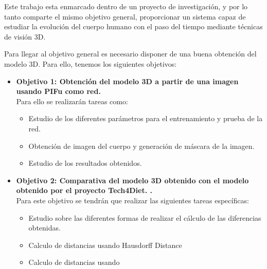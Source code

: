 
Este trabajo esta enmarcado dentro de un proyecto de investigación, y por lo tanto comparte el mismo objetivo general, proporcionar un sistema capaz de estudiar la evolución del cuerpo humano con el paso del tiempo mediante técnicas de visión 3D. 

Para llegar al objetivo general es necesario disponer de una buena obtención del modelo 3D. Para ello, tenemos los siguientes objetivos:


\begin{itemize}
	\item{\textbf{Objetivo 1: Obtención del modelo 3D a partir de una imagen usando PIFu como red.}} 
	\\Para ello se realizarán tareas como:
	\begin{itemize}
		\item Estudio de los diferentes parámetros para el entrenamiento y prueba de la red.
		\item Obtención de imagen del cuerpo y generación de máscara de la imagen.
		\item Estudio de los resultados obtenidos.
		
		
	\end{itemize}
	\item{\textbf{Objetivo 2: Comparativa del modelo 3D obtenido con el modelo obtenido por el proyecto Tech4Diet. 
			.}} \\
	Para este objetivo se tendrán que realizar las siguientes tareas específicas:
	\begin{itemize}
		\item Estudio sobre las diferentes formas de realizar el cálculo de las diferencias obtenidas.
		\item Calculo de distancias usando Hausdorff Distance
		\item Calculo de distancias usando 
	\end{itemize}
\end{itemize}

\label{sec:Introducción}

